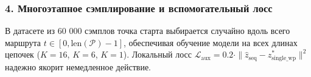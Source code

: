 \subsubsection{4. Многоэтапное сэмплирование и вспомогательный лосс}
В датасете из 60 000 сэмплов точка старта выбирается случайно вдоль всего маршрута $t \in [0, \text{len}(\mathcal{P})-1]$, обеспечивая обучение модели на всех длинах цепочек ($K=16$, $K=6$, $K=1$). Локальный лосс $\mathcal{L}_{\text{aux}} = 0.2 \cdot \|\hat{z}_{\text{seq}} - z^*_{\text{single\_wp}}\|^2$ надежно якорит немедленное действие.
